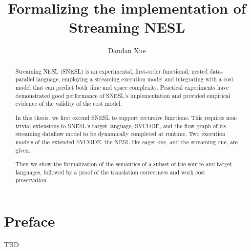 \documentclass[a4paper]{report}
\title{Formalizing the implementation of Streaming NESL}
\author{Dandan Xue}
\numberwithin{equation}{chapter}
\numberwithin{figure}{chapter}
\begin{document}
\large



\begin{abstract}
 Streaming NESL (SNESL) is an experimental, first-order functional, nested data-parallel language, employing a streaming execution model and integrating with a cost model that can predict both time and space complexity.
 Practical experiments have demonstrated good performance of SNESL's implementation and provided empirical evidence of the validity of the cost model.
 
 In this thesis, we first extend SNESL to support recursive functions.
 This requires non-trivial extensions to SNESL's target language, SVCODE, and the flow graph of its streaming dataflow model to be dynamically completed at runtime.
 Two execution models of the extended SVCODE, the NESL-like eager one, and the streaming one, are given.
 
 Then we show the formalization of the semantics of a subset of the source and target languages, followed by a proof of the translation correctness and work cost preservation.
 
\end{abstract}



\tableofcontents



\chapter*{Preface}

TBD










\end{document}
